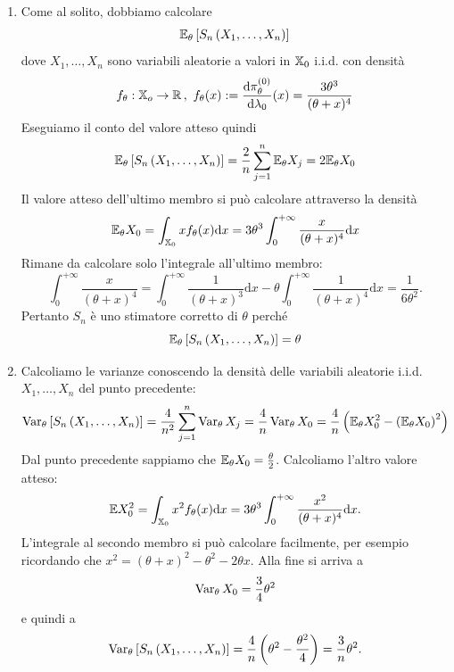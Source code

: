 \begin{soluzione}
  \begin{enumerate}
  \item Come al solito, dobbiamo calcolare
    \[
      \mathbb E_\theta \left[ S_n\left(X_1, \dots, X_n\right) \right]
    \]
    dove \(X_1, \dots, X_n\) sono variabili aleatorie a valori in \(\mathbb X_0\) i.i.d. con densità
    \[
      f_\theta : \mathbb X_o \to \mathbb R \,,\
      f_\theta (x) := \frac{\mathrm d \pi_{\theta}^{(0)}}{\mathrm d \lambda_0}(x) = \frac{3\theta^3}{(\theta + x)^4}
    \]
    Eseguiamo il conto del valore atteso quindi
    \[
      \mathbb E_\theta \left[ S_n\left(X_1, \dots, X_n\right) \right] = \frac{2}{n} \sum_{j=1}^{n} \mathbb E_\theta X_j = 2 \mathbb E_\theta X_0
    \]
    Il valore atteso dell'ultimo membro si può calcolare attraverso la densità
    \[
      \mathbb E_\theta X_0 = \int_{\mathbb X_0} x f_\theta (x) \mathrm d x = 3\theta^3 \int_{0}^{+\infty} \frac{x}{(\theta + x)^4}  \mathrm d x
    \]
    Rimane da calcolare solo l'integrale all'ultimo membro:
    \[
      \int_{0}^{+\infty} \frac{x}{(\theta + x)^4} = \int_{0}^{+\infty} \frac{1}{(\theta+x)^3} \mathrm d x - \theta \int_{0}^{+\infty}\frac{1}{(\theta+x)^4} \mathrm d x = \frac{1}{6\theta^2} .
    \]
    Pertanto \(S_n\) è uno stimatore corretto di \(\theta\) perché
    \[
      \mathbb E_\theta \left[ S_n\left(X_1, \dots, X_n\right) \right] = \theta
    \]

    
  \item Calcoliamo le varianze conoscendo la densità delle variabili aleatorie i.i.d. \(X_1, \dots, X_n\) del punto precedente:
    \[
      \operatorname{Var}_\theta \left[ S_n\left( X_1, \dots, X_n \right) \right] = \frac{4}{n^2} \sum_{j=1}^{n} \operatorname{Var}_\theta X_j = \frac{4}{n} \operatorname{Var}_\theta X_0 = \frac{4}{n} \left( \mathbb E_\theta X_0^2 - \left(\mathbb E_\theta X_0 \right)^2 \right)
    \]
    Dal punto precedente sappiamo che \(\mathbb E_\theta X_0 = \frac{\theta}{2}\). Calcoliamo l'altro valore atteso:
    \[\mathbb E X_0^2 = \int_{\mathbb X_0} x^2 f_\theta (x) \mathrm d x = 3\theta^3 \int_{0}^{+\infty} \frac{x^2}{(\theta+x)^4} \mathrm d x . \]
    L'integrale al secondo membro si può calcolare facilmente, per esempio ricordando che \(x^2 = (\theta+x)^2-\theta^2-2\theta x\). Alla fine si arriva a
    \[
      \operatorname{Var}_\theta X_0 = \frac{3}{4}\theta^2
    \]
    e quindi a
    \[
      \operatorname{Var}_\theta \left[ S_n\left( X_1, \dots, X_n \right) \right] = \frac{4}{n} \left( \theta^2 - \frac{\theta^2}{4} \right) = \frac{3}{n} \theta^2 .
    \]


\end{enumerate}
\end{soluzione}
